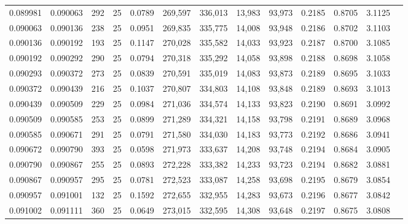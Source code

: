 \begin{tabular}{rrrrrrrrrrrrr}
0.089981 & 0.090063 &   292 &  25 &                                     0.0789 & 269,597 & 336,013 &  13,983 &  93,973 & 0.2185 & 0.8705 & 3.1125 \\
0.090063 & 0.090136 &   238 &  25 &                                     0.0951 & 269,835 & 335,775 &  14,008 &  93,948 & 0.2186 & 0.8702 & 3.1103 \\
0.090136 & 0.090192 &   193 &  25 &                                     0.1147 & 270,028 & 335,582 &  14,033 &  93,923 & 0.2187 & 0.8700 & 3.1085 \\
0.090192 & 0.090292 &   290 &  25 &                                     0.0794 & 270,318 & 335,292 &  14,058 &  93,898 & 0.2188 & 0.8698 & 3.1058 \\
0.090293 & 0.090372 &   273 &  25 &                                     0.0839 & 270,591 & 335,019 &  14,083 &  93,873 & 0.2189 & 0.8695 & 3.1033 \\
0.090372 & 0.090439 &   216 &  25 &                                     0.1037 & 270,807 & 334,803 &  14,108 &  93,848 & 0.2189 & 0.8693 & 3.1013 \\
0.090439 & 0.090509 &   229 &  25 &                                     0.0984 & 271,036 & 334,574 &  14,133 &  93,823 & 0.2190 & 0.8691 & 3.0992 \\
0.090509 & 0.090585 &   253 &  25 &                                     0.0899 & 271,289 & 334,321 &  14,158 &  93,798 & 0.2191 & 0.8689 & 3.0968 \\
0.090585 & 0.090671 &   291 &  25 &                                     0.0791 & 271,580 & 334,030 &  14,183 &  93,773 & 0.2192 & 0.8686 & 3.0941 \\
0.090672 & 0.090790 &   393 &  25 &                                     0.0598 & 271,973 & 333,637 &  14,208 &  93,748 & 0.2194 & 0.8684 & 3.0905 \\
0.090790 & 0.090867 &   255 &  25 &                                     0.0893 & 272,228 & 333,382 &  14,233 &  93,723 & 0.2194 & 0.8682 & 3.0881 \\
0.090867 & 0.090957 &   295 &  25 &                                     0.0781 & 272,523 & 333,087 &  14,258 &  93,698 & 0.2195 & 0.8679 & 3.0854 \\
0.090957 & 0.091001 &   132 &  25 &                                     0.1592 & 272,655 & 332,955 &  14,283 &  93,673 & 0.2196 & 0.8677 & 3.0842 \\
0.091002 & 0.091111 &   360 &  25 &                                     0.0649 & 273,015 & 332,595 &  14,308 &  93,648 & 0.2197 & 0.8675 & 3.0808 \\

\end{tabular}
